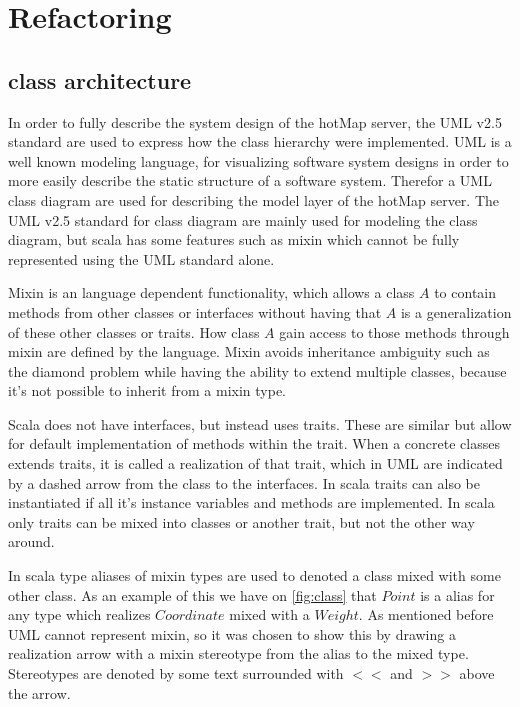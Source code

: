 \section{Refactoring} \label{sec:s4_refactoring}



\subsection{class architecture}
In order to fully describe the system design of the hotMap server, the UML v2.5 standard are used to express how the class hierarchy were implemented. UML is a well known modeling language, for visualizing software system designs in order to more easily describe the static structure of a software system.
Therefor a UML class diagram are used for describing the model layer of the hotMap server.
The UML v2.5 standard for class diagram are mainly used for modeling the class diagram, but scala has some features such as mixin which cannot be fully represented using the UML standard alone.

Mixin is an language dependent functionality, which allows a class $A$ to contain methods from other classes or interfaces without having that $A$ is a generalization of these other classes or traits. How class $A$ gain access to those methods through mixin are defined by the language. Mixin avoids inheritance ambiguity such as the diamond problem while having the ability to extend multiple classes, because it's not possible to inherit from a mixin type.

Scala does not have interfaces, but instead uses traits. These are similar but allow for default implementation of methods within the trait. When a concrete classes extends traits, it is called a realization of that trait, which in UML are indicated by a dashed arrow from the class to the interfaces. In scala traits can also be instantiated if all it's instance variables and methods are implemented. In scala only traits can be mixed into classes or another trait, but not the other way around.

In scala type aliases of mixin types are used to denoted a class mixed with some other class. As an example of this we have on \cref{fig:class} that $Point$ is a alias for any type which realizes $Coordinate$ mixed with a $Weight$. As mentioned before UML cannot represent mixin, so it was chosen to show this by drawing a realization arrow with a mixin stereotype from the alias to the mixed type. Stereotypes are denoted by some text surrounded with $<<$ and $>>$ above the arrow.

